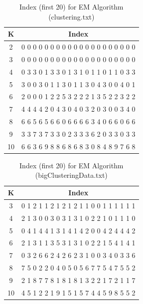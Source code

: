 \begin{description}
\begin{description}
\begin{table}[H]
	\centering
	\caption{Index (first 20) for EM Algorithm (clustering.txt)}
	\label{table:index_EM_clustering}	
	\begin{tabular}{ c | c }
		\hline \hline
		K        &    Index  \\[0.1cm]
		\hline
		2      & 0 0 0 0 0 0 0 0 0 0 0 0 0 0 0 0 0 0 0 0 \\[0.1cm]
		3     &  0 0 0 0 0 0 0 0 0 0 0 0 0 0 0 0 0 0 0 0 \\[0.1cm]
		4     &  0 3 3 0 1 3 3 0 1 3 1 0 1 1 0 1 1 0 3 3 \\[0.1cm]
		5     &  3 0 0 3 0 1 1 3 0 1 1 3 0 4 3 0 0 4 0 1 \\[0.1cm]
		6     &  2 0 0 0 1 2 2 5 3 2 2 2 1 3 5 2 2 3 2 2 \\[0.1cm]
		7     &  4 4 4 4 2 0 4 3 0 4 0 3 2 0 3 0 0 3 4 0 \\[0.1cm]
		8     &  6 6 5 6 5 6 6 0 6 6 6 6 3 4 0 6 6 0 6 6 \\[0.1cm]
		9     &  3 3 7 3 7 3 3 0 2 3 3 3 6 2 0 3 3 0 3 3 \\[0.1cm]
		10   &  6 6 3 6 9 8 8 6 8 6 8 3 0 8 4 8 9 7 6 8 \\[0.1cm]
		\hline	
	\end{tabular}
\end{table}

\begin{table}[H]
	\centering
	\caption{Index (first 20) for EM Algorithm (bigClusteringData.txt)}
	\label{table:index_EM_bigClustering}	
	\begin{tabular}{ c | c }
		\hline \hline
		K    & Index \\[0.1cm]
		\hline
		3     &  0 1 2 1 1 2 1 2 1 2 1 1 0 0 1 1 1 1 1 1 \\[0.1cm]
		4     &  2 1 3 0 0 3 0 3 1 3 1 0 2 2 1 0 1 1 1 0 \\[0.1cm]
		5     &  0 4 1 4 4 1 3 1 4 1 4 2 0 0 4 2 4 4 4 2 \\[0.1cm]
		6     &  2 1 3 1 1 3 5 3 1 3 1 0 2 2 1 5 4 1 4 1 \\[0.1cm]
		7     &  0 3 2 6 6 2 4 2 6 2 3 1 0 0 3 4 0 3 3 6 \\[0.1cm]
		8     &  7 5 0 2 2 0 4 0 5 0 5 6 7 7 5 4 7 5 5 2 \\[0.1cm]
		9     &  2 1 8 7 7 8 1 8 1 8 1 3 2 2 1 7 2 1 1 7 \\[0.1cm]
		10   &  4 5 1 2 2 1 9 1 5 1 5 7 4 4 5 9 8 5 5 2 \\[0.1cm]
		\hline	
	\end{tabular}
\end{table}
\end{description}

\end{description}



